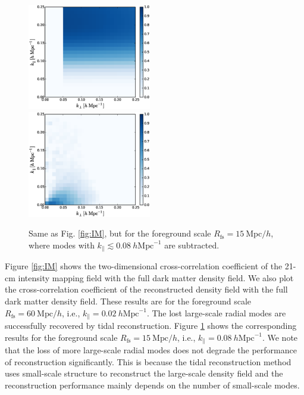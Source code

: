 \documentclass[prd,superscriptaddress,floatfix,notitlepage,nofootinbib,reprint]{revtex4-1}
\newcommand{\mr}{\mathrm}
\newcommand{\kpa}{k_\parallel}
\begin{document}
\begin{figure}[tbp]
\begin{center}
\includegraphics[width=0.48\textwidth]{./figs/IM2.eps}\\
\includegraphics[width=0.48\textwidth]{./figs/kap2.eps}
\end{center}
\vspace{-0.7cm}
\caption{Same as Fig. \ref{fig:IM}, but for the foreground scale 
$R_\mr{fs}=15\ \mr{Mpc}/h$, where modes with $\kpa\lesssim0.08\ h\mr{Mpc}^{-1}$ 
are subtracted.}
\label{fig:IM2}
\end{figure}

Figure \ref{fig:IM} shows the two-dimensional cross-correlation coefficient of
the 21-cm intensity mapping field with the full dark matter density field. 
We also plot the cross-correlation coefficient of the reconstructed density
field with the full dark matter density field.
These results are for the foreground scale $R_\mr{fs}=60\ \mr{Mpc}/h$, i.e.,
$\kpa=0.02\ h\mr{Mpc}^{-1}$.
The lost large-scale radial modes are successfully recovered by tidal 
reconstruction.
Figure \ref{fig:IM2} shows the corresponding results for the foreground scale
$R_\mr{fs}=15\ \mr{Mpc}/h$, i.e., $\kpa=0.08\ h\mr{Mpc}^{-1}$.
We note that the loss of more large-scale radial modes does not degrade the 
performance of reconstruction significantly.
This is because the tidal reconstruction method uses small-scale structure to 
reconstruct the large-scale density field and the reconstruction performance 
mainly depends on the number of small-scale modes.
\end{document}
